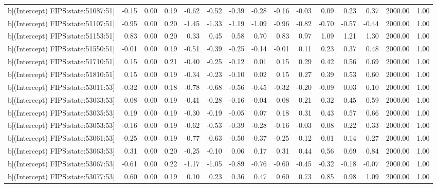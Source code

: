 \begin{table}[ht]
\begin{tabular}{rrrrrrrrrrrrrrr}
  b[(Intercept) FIPS:state:51087:51] & -0.15 & 0.00 & 0.19 & -0.62 & -0.52 & -0.39 & -0.28 & -0.16 & -0.03 & 0.09 & 0.23 & 0.37 & 2000.00 & 1.00 \\ 
  b[(Intercept) FIPS:state:51107:51] & -0.95 & 0.00 & 0.20 & -1.45 & -1.33 & -1.19 & -1.09 & -0.96 & -0.82 & -0.70 & -0.57 & -0.44 & 2000.00 & 1.00 \\ 
  b[(Intercept) FIPS:state:51153:51] & 0.83 & 0.00 & 0.20 & 0.33 & 0.45 & 0.58 & 0.70 & 0.83 & 0.97 & 1.09 & 1.21 & 1.30 & 2000.00 & 1.00 \\ 
  b[(Intercept) FIPS:state:51550:51] & -0.01 & 0.00 & 0.19 & -0.51 & -0.39 & -0.25 & -0.14 & -0.01 & 0.11 & 0.23 & 0.37 & 0.48 & 2000.00 & 1.00 \\ 
  b[(Intercept) FIPS:state:51710:51] & 0.15 & 0.00 & 0.21 & -0.40 & -0.25 & -0.12 & 0.01 & 0.15 & 0.29 & 0.42 & 0.56 & 0.69 & 2000.00 & 1.00 \\ 
  b[(Intercept) FIPS:state:51810:51] & 0.15 & 0.00 & 0.19 & -0.34 & -0.23 & -0.10 & 0.02 & 0.15 & 0.27 & 0.39 & 0.53 & 0.60 & 2000.00 & 1.00 \\ 
  b[(Intercept) FIPS:state:53011:53] & -0.32 & 0.00 & 0.18 & -0.78 & -0.68 & -0.56 & -0.45 & -0.32 & -0.20 & -0.09 & 0.03 & 0.10 & 2000.00 & 1.00 \\ 
  b[(Intercept) FIPS:state:53033:53] & 0.08 & 0.00 & 0.19 & -0.41 & -0.28 & -0.16 & -0.04 & 0.08 & 0.21 & 0.32 & 0.45 & 0.59 & 2000.00 & 1.00 \\ 
  b[(Intercept) FIPS:state:53035:53] & 0.19 & 0.00 & 0.19 & -0.30 & -0.19 & -0.05 & 0.07 & 0.18 & 0.31 & 0.43 & 0.57 & 0.66 & 2000.00 & 1.00 \\ 
  b[(Intercept) FIPS:state:53053:53] & -0.16 & 0.00 & 0.19 & -0.62 & -0.53 & -0.39 & -0.28 & -0.16 & -0.03 & 0.08 & 0.22 & 0.33 & 2000.00 & 1.00 \\ 
  b[(Intercept) FIPS:state:53061:53] & -0.25 & 0.00 & 0.19 & -0.77 & -0.63 & -0.50 & -0.37 & -0.25 & -0.12 & -0.01 & 0.14 & 0.27 & 2000.00 & 1.00 \\ 
  b[(Intercept) FIPS:state:53063:53] & 0.31 & 0.00 & 0.20 & -0.25 & -0.10 & 0.06 & 0.17 & 0.31 & 0.44 & 0.56 & 0.69 & 0.84 & 2000.00 & 1.00 \\ 
  b[(Intercept) FIPS:state:53067:53] & -0.61 & 0.00 & 0.22 & -1.17 & -1.05 & -0.89 & -0.76 & -0.60 & -0.45 & -0.32 & -0.18 & -0.07 & 2000.00 & 1.00 \\ 
  b[(Intercept) FIPS:state:53077:53] & 0.60 & 0.00 & 0.19 & 0.10 & 0.23 & 0.36 & 0.47 & 0.60 & 0.73 & 0.85 & 0.98 & 1.09 & 2000.00 & 1.00 \\ 

\end{tabular}
\end{table}
